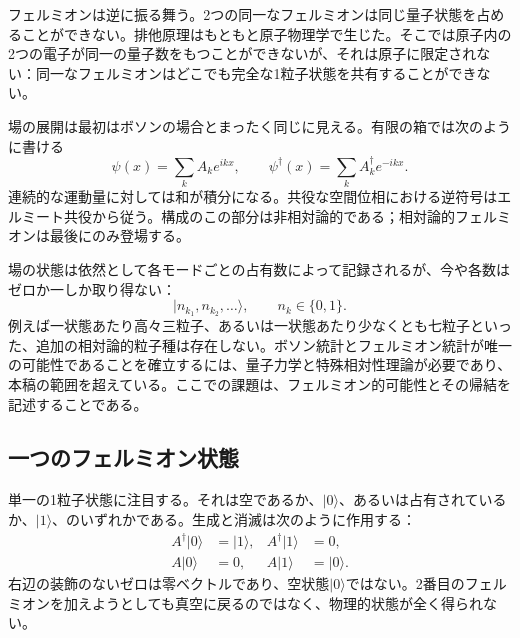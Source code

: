 フェルミオンは逆に振る舞う。2つの同一なフェルミオンは同じ量子状態を占めることができない。排他原理はもともと原子物理学で生じた。そこでは原子内の2つの電子が同一の量子数をもつことができないが、それは原子に限定されない：同一なフェルミオンはどこでも完全な1粒子状態を共有することができない。

場の展開は最初はボソンの場合とまったく同じに見える。有限の箱では次のように書ける
\begin{equation}
\psi(x)=\sum_k A_k e^{ikx},
\qquad
\psi^\dagger(x)=\sum_k A_k^\dagger e^{-ikx}.
\end{equation}
連続的な運動量に対しては和が積分になる。共役な空間位相における逆符号はエルミート共役から従う。構成のこの部分は非相対論的である；相対論的フェルミオンは最後にのみ登場する。

場の状態は依然として各モードごとの占有数によって記録されるが、今や各数はゼロか一しか取り得ない：
\begin{equation}
|n_{k_1},n_{k_2},\ldots\rangle,
\qquad n_k\in\{0,1\}.
\end{equation}
例えば一状態あたり高々三粒子、あるいは一状態あたり少なくとも七粒子といった、追加の相対論的粒子種は存在しない。ボソン統計とフェルミオン統計が唯一の可能性であることを確立するには、量子力学と特殊相対性理論が必要であり、本稿の範囲を超えている。ここでの課題は、フェルミオン的可能性とその帰結を記述することである。

\subsection{一つのフェルミオン状態}

単一の1粒子状態に注目する。それは空であるか、\(|0\rangle\)、あるいは占有されているか、\(|1\rangle\)、のいずれかである。生成と消滅は次のように作用する：
\begin{align}
A^\dagger|0\rangle&=|1\rangle,
&
A^\dagger|1\rangle&=0,
\\
A|0\rangle&=0,
&
A|1\rangle&=|0\rangle.
\end{align}
右辺の装飾のないゼロは零ベクトルであり、空状態\(|0\rangle\)ではない。2番目のフェルミオンを加えようとしても真空に戻るのではなく、物理的状態が全く得られない。

\begin{classroomqa}
\end{classroomqa}

